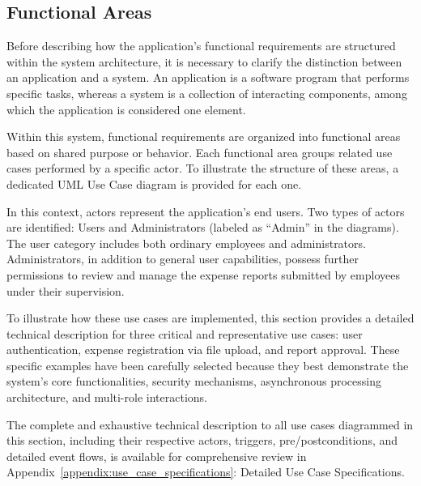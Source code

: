 \subsection{Functional Areas}
\label{sec:functional-areas}

Before describing how the application's functional requirements are structured within the system architecture, it is necessary to clarify the distinction between an application and a system. An application is a software program that performs specific tasks, whereas a system is a collection of interacting components, among which the application is considered one element.

Within this system, functional requirements are organized into functional areas based on shared purpose or behavior. Each functional area groups related use cases performed by a specific actor. To illustrate the structure of these areas, a dedicated UML Use Case diagram is provided for each one.

In this context, actors represent the application's end users. Two types of actors are identified: Users and Administrators (labeled as “Admin” in the diagrams). The user category includes both ordinary employees and administrators. Administrators, in addition to general user capabilities, possess further permissions to review and manage the expense reports submitted by employees under their supervision.

To illustrate how these use cases are implemented, this section provides a detailed technical description for three critical and representative use cases: user authentication, expense registration via file upload, and report approval. These specific examples have been carefully selected because they best demonstrate the system's core functionalities, security mechanisms, asynchronous processing architecture, and multi-role interactions.

The complete and exhaustive technical description to all use cases diagrammed in this section, including their respective actors, triggers, pre/postconditions, and detailed event flows, is available for comprehensive review in Appendix~\ref{appendix:use_case_specifications}: Detailed Use Case Specifications.






